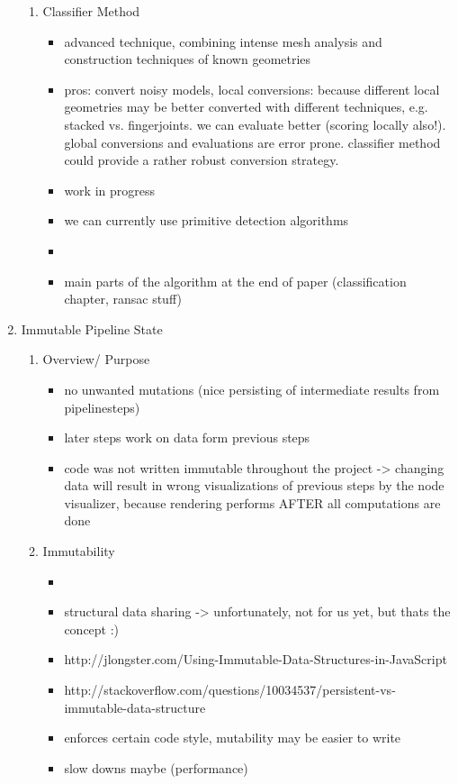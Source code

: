 \documentclass[../ClassicThesis.tex]{subfiles}
\begin{document}
\begin{enumerate}
\begin{enumerate}
  \item Classifier Method
    \begin{itemize}
    \item advanced technique, combining intense mesh analysis and construction
      techniques of known geometries
    \item pros: convert noisy models, local conversions: because different local
      geometries may be better converted with different techniques, e.g. stacked
      vs. fingerjoints. we can evaluate better (scoring locally also!). global
      conversions and evaluations are error prone. classifier method could
      provide a rather robust conversion strategy. 
    \item work in progress
    \item we can currently use primitive detection algorithms
    \item {}
    \item main parts of the algorithm at the end of paper (classification
      chapter, ransac stuff)
    \end{itemize}
  \end{enumerate}

\item Immutable Pipeline State

  \begin{enumerate}
  \item Overview/ Purpose
    \begin{itemize}
    \item no unwanted mutations (nice persisting of intermediate results from
      pipelinesteps)
    \item later steps work on data form previous steps
    \item code was not written immutable throughout the project -> changing data
      will result in wrong visualizations of previous steps by the node
      visualizer, because rendering performs AFTER all computations are done
    \end{itemize}

  \item Immutability
    \begin{itemize}
    \item {}
    \item structural data sharing -> unfortunately, not for us yet, but thats
      the concept :)
    \item http://jlongster.com/Using-Immutable-Data-Structures-in-JavaScript
    \item http://stackoverflow.com/questions/10034537/persistent-vs-immutable-data-structure
    \item enforces certain code style, mutability may be easier to write
    \item slow downs maybe (performance)
    \end{itemize}


\end{enumerate}
\end{enumerate}
\end{document}
